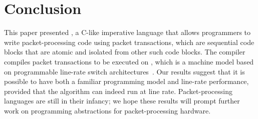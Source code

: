\section{Conclusion}
\label{s:conclusion}

This paper presented \pktlanguage, a C-like imperative language that allows
programmers to write packet-processing code using packet transactions, which are
sequential code blocks that are atomic and isolated from other such code
blocks. The \pktlanguage compiler compiles packet transactions to be executed on
\absmachine,
which is a machine model based on programmable line-rate switch
architectures~\cite{flexpipe, xpliant, rmt}. Our results suggest that it is
possible to have both a familiar programming model and line-rate
performance, provided that the algorithm can indeed run at line rate.
Packet-processing languages are still in their infancy; we hope these results
will prompt further work on programming abstractions for packet-processing hardware.
